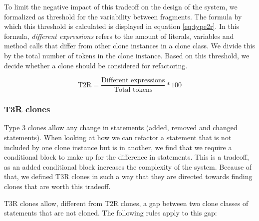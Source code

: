 \documentclass[a4paper]{article}
\begin{document}
To limit the negative impact of this tradeoff on the design of the system, we formalized as threshold for the variability between fragments. The formula by which this threshold is calculated is displayed in equation \ref{eq:type2r}. In this formula, \textit{different expressions} refers to the amount of literals, variables and method calls that differ from other clone instances in a clone class. We divide this by the total number of tokens in the clone instance. Based on this threshold, we decide whether a clone should be considered for refactoring.

\begin{equation}\label{eq:type2r}
\text{T2R}=\frac{\text{Different expressions}}{\text{Total tokens}}*100
\end{equation}

\subsubsection{T3R clones}\label{sec:type3r}
Type 3 clones allow any change in statements (added, removed and changed statements). When looking at how we can refactor a statement that is not included by one clone instance but is in another, we find that we require a conditional block to make up for the difference in statements. This is a tradeoff, as an added conditional block increases the complexity of the system. Because of that, we defined T3R clones in such a way that they are directed towards finding clones that are worth this tradeoff.

T3R clones allow, different from T2R clones, a gap between two clone classes of statements that are not cloned. The following rules apply to this gap:
\end{document}
